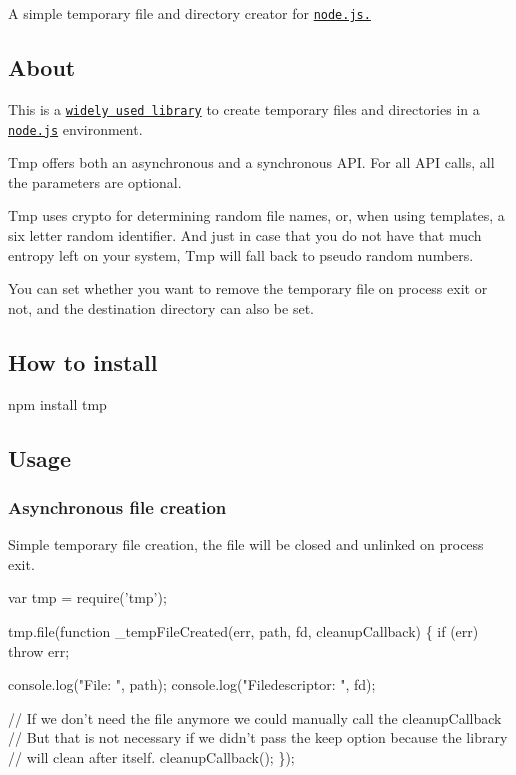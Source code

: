 A simple temporary file and directory creator for \href{http://nodejs.org/}{\tt node.\+js.}

\href{http://travis-ci.org/raszi/node-tmp}{\tt }

\subsection*{About}

This is a \href{https://www.npmjs.com/browse/depended/tmp}{\tt widely used library} to create temporary files and directories in a \href{http://nodejs.org/}{\tt node.\+js} environment.

Tmp offers both an asynchronous and a synchronous A\+PI. For all A\+PI calls, all the parameters are optional.

Tmp uses crypto for determining random file names, or, when using templates, a six letter random identifier. And just in case that you do not have that much entropy left on your system, Tmp will fall back to pseudo random numbers.

You can set whether you want to remove the temporary file on process exit or not, and the destination directory can also be set.

\subsection*{How to install}


\begin{DoxyCode}
npm install tmp
\end{DoxyCode}


\subsection*{Usage}

\subsubsection*{Asynchronous file creation}

Simple temporary file creation, the file will be closed and unlinked on process exit.


\begin{DoxyCode}
var tmp = require('tmp');

tmp.file(function \_tempFileCreated(err, path, fd, cleanupCallback) \{
  if (err) throw err;

  console.log("File: ", path);
  console.log("Filedescriptor: ", fd);

  // If we don't need the file anymore we could manually call the cleanupCallback
  // But that is not necessary if we didn't pass the keep option because the library
  // will clean after itself.
  cleanupCallback();
\});
\end{DoxyCode}


